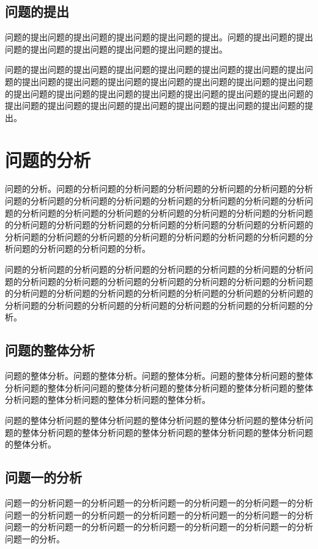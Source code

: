 \documentclass{MMCStyle}
\begin{document}
	\subsection{问题的提出}
问题的提出问题的提出问题的提出问题的提出问题的提出。问题的提出问题的提出问题的提出问题的提出问题的提出问题的提出问题的提出。

问题的提出问题的提出问题的提出问题的提出问题的提出问题的提出问题的提出问题的提出问题的提出问题的提出问题的提出问题的提出问题的提出问题的提出问题的提出问题的提出问题的提出问题的提出问题的提出问题的提出问题的提出问题的提出问题的提出问题的提出问题的提出问题的提出问题的提出问题的提出问题的提出。

	\section{问题的分析}
问题的分析。问题的分析问题的分析问题的分析问题的分析问题的分析问题的分析问题的分析问题的分析问题的分析问题的分析问题的分析问题的分析问题的分析问题的分析问题的分析问题的分析问题的分析问题的分析问题的分析问题的分析问题的分析问题的分析问题的分析问题的分析问题的分析问题的分析问题的分析问题的分析问题的分析问题的分析问题的分析问题的分析问题的分析问题的分析问题的分析问题的分析问题的分析问题的分析。

问题的分析问题的分析问题的分析问题的分析问题的分析问题的分析问题的分析问题的分析问题的分析问题的分析问题的分析问题的分析问题的分析问题的分析问题的分析问题的分析问题的分析问题的分析问题的分析问题的分析问题的分析问题的分析问题的分析问题的分析问题的分析问题的分析问题的分析问题的分析问题的分析。

	\subsection{问题的整体分析}
问题的整体分析。问题的整体分析。问题的整体分析。问题的整体分析问题的整体分析问题的整体分析问问题的整体分析问题的整体分析问题的整体分析问题的整体分析问题的整体分析问题的整体分析问题的整体分析。

问题的整体分析问题的整体分析问题的整体分析问题的整体分析问题的整体分析问题的整体分析问题的整体分析问题的整体分析问题的整体分析问题的整体分析问题的整体分析。
	\subsection{问题一的分析}
问题一的分析问题一的分析问题一的分析问题一的分析问题一的分析问题一的分析问题一的分析问题一的分析问题一的分析问题一的分析问题一的分析问题一的分析问题一的分析问题一的分析问题一的分析问题一的分析问题一的分析问题一的分析问题一的分析。
\end{document}
